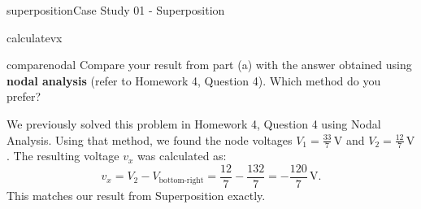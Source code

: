 \begin{mainquestion}{superposition}{Case Study 01 - Superposition}
\begin{partquestion}{calculatevx}
\qnewpage
\end{partquestion}

\begin{partquestion}{comparenodal}
{Compare your result from part (a) with the answer obtained using \textbf{nodal analysis} (refer to Homework 4, Question 4). Which method do you prefer?}

\begin{answer}
        We previously solved this problem in Homework 4, Question 4 using Nodal Analysis. Using that method, we found the node voltages $V_1 = \frac{33}{7}\,\text{V}$ and $V_2 = \frac{12}{7}\,\text{V}$. The resulting voltage $v_x$ was calculated as:
        \[
        v_x = V_2 - V_{\text{bottom-right}} = \frac{12}{7} - \frac{132}{7} = -\frac{120}{7}\,\text{V}.
        \]
        This matches our result from Superposition exactly.
\end{answer}

\end{partquestion}

\end{mainquestion}
